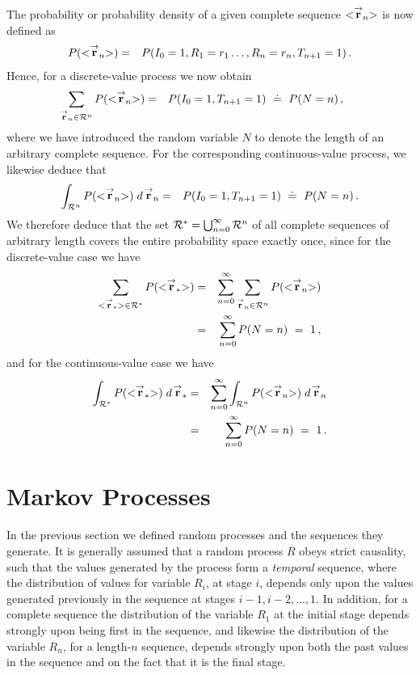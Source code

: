 \documentclass{report}
\begin{document}
The probability or probability density 
of a given complete sequence $<\stackrel{\rightarrow}{\bf r}_n>$ is now defined as
\begin{eqnarray}
P(<\stackrel{\rightarrow}{\bf r}_n>)
& = & P(I_0=1,R_1=r_1\ldots,R_n=r_n,T_{n+1}=1)\,.
\end{eqnarray}
Hence, for a discrete-value process we now obtain
\begin{eqnarray}
\hspace*{-5mm}
\sum_{\stackrel{\rightarrow}{\bf r}_n\in{\cal R}^n}
P(<\stackrel{\rightarrow}{\bf r}_n>)
& = & P(I_0=1,T_{n+1}=1)
~\doteq~P(N=n)\,,
\end{eqnarray}
where we have introduced the random variable $N$ to denote the length of an
arbitrary complete sequence. 
For the corresponding continuous-value process, we likewise deduce that
\begin{eqnarray}
\int_{{\cal R}^n}
P(<\stackrel{\rightarrow}{\bf r}_n>)\;d\!\stackrel{\rightarrow}{\bf r}_n
& = & 
P(I_0=1,T_{n+1}=1)
~\doteq~P(N=n)\,.
\end{eqnarray}
We therefore deduce that the set ${\cal R}^{*}=\bigcup_{n=0}^{\infty}{\cal R}^n$ 
of all complete sequences of arbitrary length
covers the entire probability space exactly once, since for the discrete-value case we have
\begin{eqnarray}
\sum_{<\stackrel{\rightarrow}{\bf r}_{*}>\in{\cal R}^{*}}
P(<\stackrel{\rightarrow}{\bf r}_{*}>)
& = & \sum_{n=0}^{\infty}
\sum_{\stackrel{\rightarrow}{\bf r}_n\in{\cal R}^n}
P(<\stackrel{\rightarrow}{\bf r}_n>)
\nonumber\\
& = & \sum_{n=0}^{\infty}P(N=n)~=~1\,,
\end{eqnarray}
and for the continuous-value case we have
\begin{eqnarray}
\int_{{\cal R}^{*}}
P(<\stackrel{\rightarrow}{\bf r}_{*}>)
\;d\!\stackrel{\rightarrow}{\bf r}_{*}
& = & \sum_{n=0}^{\infty}
\int_{{\cal R}^n}
P(<\stackrel{\rightarrow}{\bf r}_n>)
\;d\!\stackrel{\rightarrow}{\bf r}_n
\nonumber\\
& = & \sum_{n=0}^{\infty}P(N=n)~=~1\,.
\end{eqnarray}

\section{Markov Processes}
In the previous section we defined random processes and the sequences they generate.
It is generally assumed that a random process $R$ obeys strict causality, such that the
values generated by the process form a {\em temporal} sequence, where the distribution of
values for variable $R_i$, at stage $i$, depends only upon the values generated previously
in the sequence at stages $i-1,i-2,\ldots,1$. In addition, for a complete sequence
the distribution of the variable $R_1$ at the initial stage depends strongly upon being first
in the sequence, and likewise the distribution of the variable $R_n$, for a length-$n$
sequence, depends strongly upon both the past values in the sequence and on the fact
that it is the final stage.
\end{document}
